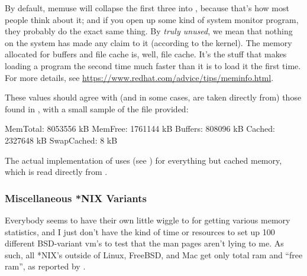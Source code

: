 By default, memuse will collapse the first three into , because that's how most people 
think about it; and if you open up some kind of system monitor program, they probably do the 
exact same thing.  By \emph{truly unused}, we mean that nothing on the system has made any claim to 
it (according to the kernel).  The memory allocated for buffers and file cache is, well, file 
cache.  It's the stuff that makes loading a program the second time much faster than it is to load 
it the first time.  For more details, see \url{https://www.redhat.com/advice/tips/meminfo.html}.

These values should agree with (and in some cases, are taken directly from) those found in 
, with a small sample of the file provided:

\begin{center}
\begin{minipage}{.4\textwidth}
\begin{Output}
MemTotal:        8053556 kB
MemFree:         1761144 kB
Buffers:          808096 kB
Cached:          2327648 kB
SwapCached:            8 kB
\end{Output}
\end{minipage}
\end{center}

The actual implementation of  uses  (see ) for everything but cached memory, which is read directly from .


% 
% 
% 
% 



\subsubsection{Miscellaneous *NIX Variants}

Everybody seems to have their own little wiggle to  for getting 
various memory statistics, and I just don't have the kind of time or resources 
to set up 100 different BSD-variant vm's to test that the man pages aren't lying 
to me.  As such, all *NIX's outside of Linux, FreeBSD, and Mac get only total ram and 
``free ram'', as reported by .


